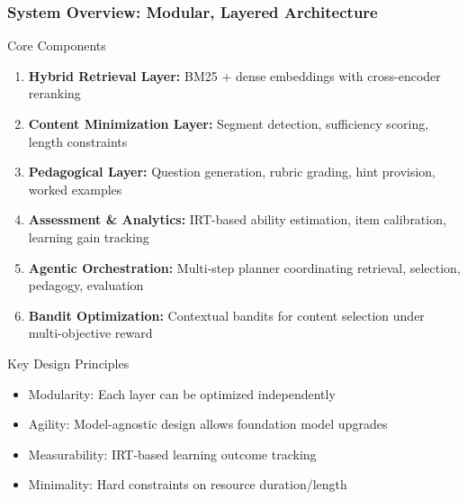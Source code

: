 \documentclass[aspectratio=169]{beamer}
\begin{document}
\begin{frame}
\frametitle{System Overview: Modular, Layered Architecture}
\begin{block}{Core Components}
\begin{enumerate}
\item \textbf{Hybrid Retrieval Layer:} BM25 + dense embeddings with cross-encoder reranking
\item \textbf{Content Minimization Layer:} Segment detection, sufficiency scoring, length constraints
\item \textbf{Pedagogical Layer:} Question generation, rubric grading, hint provision, worked examples
\item \textbf{Assessment \& Analytics:} IRT-based ability estimation, item calibration, learning gain tracking
\item \textbf{Agentic Orchestration:} Multi-step planner coordinating retrieval, selection, pedagogy, evaluation
\item \textbf{Bandit Optimization:} Contextual bandits for content selection under multi-objective reward
\end{enumerate}
\end{block}

\begin{block}{Key Design Principles}
\begin{itemize}
\item \textcolor{mygreen}{Modularity:} Each layer can be optimized independently
\item \textcolor{mygreen}{Agility:} Model-agnostic design allows foundation model upgrades
\item \textcolor{mygreen}{Measurability:} IRT-based learning outcome tracking
\item \textcolor{mygreen}{Minimality:} Hard constraints on resource duration/length
\end{itemize}
\end{block}
\end{frame}
\end{document}
